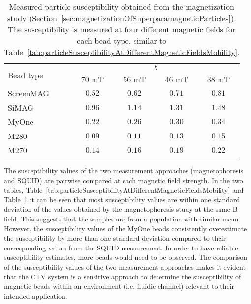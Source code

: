 \begin{table}[htb]
\begin{center}
\caption[Measured particle susceptibility at different magnet positions from the magnetization study]{Measured particle susceptibility obtained from the magnetization study (Section~\ref{sec:magnetizationOfSuperparamagneticParticles}). The susceptibility is measured at four different magnetic fields for each bead type, similar to Table~\ref{tab:particleSusceptibilityAtDifferentMagneticFieldsMobility}.}
\vspace{1ex}
\label{tab:particleSusceptibilityAtDifferentMagneticFieldsMagnetization}
\begin{tabular}{lcccc}
\hline
\multirow{2}[4]{2cm}{Bead type} & \multicolumn{4}{c}{$\chi$} \\ 
\cmidrule{2-5}
& $70$ mT & $56$ mT & $46$ mT & $38$ mT \\
\hline
ScreenMAG 	& $0.52$ & $0.62$ & $0.71$ & $0.81$ \\
SiMAG 			& $0.96$ & $1.14$ & $1.31$ & $1.48$ \\
MyOne 			& $0.22$ & $0.26$ & $0.30$ & $0.34$ \\
M280 			& $0.09$ & $0.11$ & $0.13$ & $0.15$ \\
M270 			& $0.14$ & $0.16$ & $0.19$ & $0.22$ \\
\hline
\end{tabular}
\end{center}
\end{table}

The susceptibility values of the two measurement approaches (magnetophoresis and SQUID) are pairwise compared at each magnetic field strength. In the two tables, Table~\ref{tab:particleSusceptibilityAtDifferentMagneticFieldsMobility} and Table~\ref{tab:particleSusceptibilityAtDifferentMagneticFieldsMagnetization} it can be seen that most susceptibility values are within one standard deviation of the values obtained by the magnetophoresis study at the same B-field. This suggests that the samples are from a population with similar mean. However, the susceptibility values of the MyOne beads consistently overestimate the susceptibility by more than one standard deviation compared to their corresponding values from the SQUID measurement. In order to have reliable susceptibility estimates, more beads would need to be observed. The comparison of the susceptibility values of the two measurement approaches makes it evident that the CTV system is a sensitive approach to determine the susceptibility of magnetic beads within an environment (i.e. fluidic channel) relevant to their intended application.

